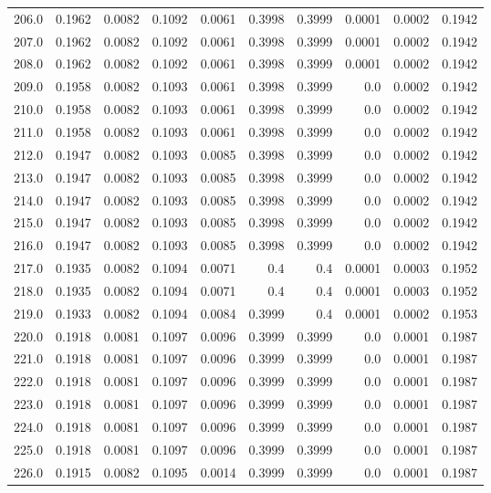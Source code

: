 \begin{longtable}{lrrrrrrrrr}
206.0 & 0.1962 & 0.0082 & 0.1092 & 0.0061 & 0.3998 & 0.3999 & 0.0001 & 0.0002 & 0.1942 \\
207.0 & 0.1962 & 0.0082 & 0.1092 & 0.0061 & 0.3998 & 0.3999 & 0.0001 & 0.0002 & 0.1942 \\
208.0 & 0.1962 & 0.0082 & 0.1092 & 0.0061 & 0.3998 & 0.3999 & 0.0001 & 0.0002 & 0.1942 \\
209.0 & 0.1958 & 0.0082 & 0.1093 & 0.0061 & 0.3998 & 0.3999 & 0.0 & 0.0002 & 0.1942 \\
210.0 & 0.1958 & 0.0082 & 0.1093 & 0.0061 & 0.3998 & 0.3999 & 0.0 & 0.0002 & 0.1942 \\
211.0 & 0.1958 & 0.0082 & 0.1093 & 0.0061 & 0.3998 & 0.3999 & 0.0 & 0.0002 & 0.1942 \\
212.0 & 0.1947 & 0.0082 & 0.1093 & 0.0085 & 0.3998 & 0.3999 & 0.0 & 0.0002 & 0.1942 \\
213.0 & 0.1947 & 0.0082 & 0.1093 & 0.0085 & 0.3998 & 0.3999 & 0.0 & 0.0002 & 0.1942 \\
214.0 & 0.1947 & 0.0082 & 0.1093 & 0.0085 & 0.3998 & 0.3999 & 0.0 & 0.0002 & 0.1942 \\
215.0 & 0.1947 & 0.0082 & 0.1093 & 0.0085 & 0.3998 & 0.3999 & 0.0 & 0.0002 & 0.1942 \\
216.0 & 0.1947 & 0.0082 & 0.1093 & 0.0085 & 0.3998 & 0.3999 & 0.0 & 0.0002 & 0.1942 \\
217.0 & 0.1935 & 0.0082 & 0.1094 & 0.0071 & 0.4 & 0.4 & 0.0001 & 0.0003 & 0.1952 \\
218.0 & 0.1935 & 0.0082 & 0.1094 & 0.0071 & 0.4 & 0.4 & 0.0001 & 0.0003 & 0.1952 \\
219.0 & 0.1933 & 0.0082 & 0.1094 & 0.0084 & 0.3999 & 0.4 & 0.0001 & 0.0002 & 0.1953 \\
220.0 & 0.1918 & 0.0081 & 0.1097 & 0.0096 & 0.3999 & 0.3999 & 0.0 & 0.0001 & 0.1987 \\
221.0 & 0.1918 & 0.0081 & 0.1097 & 0.0096 & 0.3999 & 0.3999 & 0.0 & 0.0001 & 0.1987 \\
222.0 & 0.1918 & 0.0081 & 0.1097 & 0.0096 & 0.3999 & 0.3999 & 0.0 & 0.0001 & 0.1987 \\
223.0 & 0.1918 & 0.0081 & 0.1097 & 0.0096 & 0.3999 & 0.3999 & 0.0 & 0.0001 & 0.1987 \\
224.0 & 0.1918 & 0.0081 & 0.1097 & 0.0096 & 0.3999 & 0.3999 & 0.0 & 0.0001 & 0.1987 \\
225.0 & 0.1918 & 0.0081 & 0.1097 & 0.0096 & 0.3999 & 0.3999 & 0.0 & 0.0001 & 0.1987 \\
226.0 & 0.1915 & 0.0082 & 0.1095 & 0.0014 & 0.3999 & 0.3999 & 0.0 & 0.0001 & 0.1987 \\

\end{longtable}
